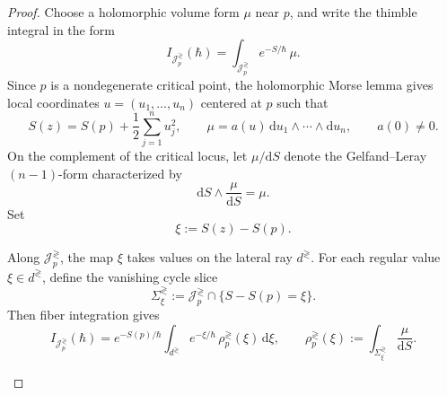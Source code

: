 \documentclass[11pt]{amsart}
\theoremstyle{plain}
\newcommand{\dd}{\mathrm d}
\newcommand{\J}{\mathcal J}
\begin{document}
\begin{proof}
Choose a holomorphic volume form \(\mu\) near \(p\), and write the thimble integral in the form
\[
I_{\J_p^{\gtrless}}(\hbar)=\int_{\J_p^{\gtrless}} e^{-S/\hbar}\,\mu.
\]
Since \(p\) is a nondegenerate critical point, the holomorphic Morse lemma gives local coordinates \(u=(u_1,\dots,u_n)\) centered at \(p\) such that
\[
S(z)=S(p)+\frac12\sum_{j=1}^n u_j^2,
\qquad
\mu=a(u)\,\dd u_1\wedge\cdots\wedge \dd u_n,
\qquad a(0)\neq 0.
\]
On the complement of the critical locus, let \(\mu/\dd S\) denote the Gelfand--Leray \((n-1)\)-form characterized by
\[
\dd S\wedge \frac{\mu}{\dd S}=\mu.
\]
Set
\[
\xi:=S(z)-S(p).
\]

Along \(\J_p^{\gtrless}\), the map \(\xi\) takes values on the lateral ray \(d^{\gtrless}\).  For each regular value \(\xi\in d^{\gtrless}\), define the vanishing cycle slice
\[
\Sigma_{\xi}^{\gtrless}:=\J_p^{\gtrless}\cap\{S-S(p)=\xi\}.
\]
Then fiber integration gives
\begin{equation}\label{eq:thimble-change-variable}
I_{\J_p^{\gtrless}}(\hbar)
=
e^{-S(p)/\hbar}
\int_{d^{\gtrless}} e^{-\xi/\hbar}\,\rho_p^{\gtrless}(\xi)\,\dd\xi,
\qquad
\rho_p^{\gtrless}(\xi):=\int_{\Sigma_{\xi}^{\gtrless}} \frac{\mu}{\dd S}.
\end{equation}


\begin{figure}[!htbp]
\centering
\begin{tikzpicture}[scale=0.8,>=Latex]


\end{tikzpicture}
\end{figure}
\end{proof}
\end{document}
